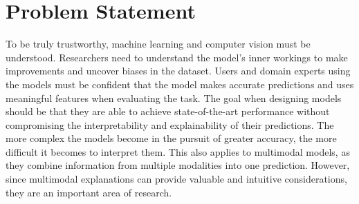\begin{comment}
In a short and precise way, state what your research is about in this thesis. It can be in the form of a (set of) research questions, goals/aims, or objectives (or a mix) - but it should clearly state what the problems or challenges you are addressing.

Alternatively, one can state a research hypothesis, but if so, it should follow the rules of what a hypothesis is. A hypothesis is a statement that introduces a research question and proposes an expected result. It is an integral part of the scientific method that forms the basis of scientific experiments. Therefore, you need to be careful and thorough when building your hypothesis, following the "rules".
\end{comment}

\section{Problem Statement}
    \label{sec:1_2_problem_statement}

To be truly trustworthy, machine learning and computer vision must be understood. Researchers need to understand the model's inner workings to make improvements and uncover biases in the dataset. Users and domain experts using the models must be confident that the model makes accurate predictions and uses meaningful features when evaluating the task. 
The goal when designing models should be that they are able to achieve state-of-the-art performance without compromising the interpretability and explainability of their predictions.
The more complex the models become in the pursuit of greater accuracy, the more difficult it becomes to interpret them. This also applies to multimodal models, as they combine information from multiple modalities into one prediction. However, since multimodal explanations can provide valuable and intuitive considerations, they are an important area of research.


\begin{comment}


The main topics that will be explored to reach the research goal are: 
\begin{itemize}
    \item Does an explainable image caption model improve its answers when trained on a \gls{vqa} dataset?
    \item With only the explaining model choosing the captions, will the output be more intuitive for humans?
    \item Are the explanations, both captions, and answers from open-ended questions locally faithful to the underlying \gls{cnn} model?
    \item If there is enough time during this thesis, it would be an interesting task to see if the image caption and \gls{vqa} will perform better when using transfer learning  on a language model pretrained on a large language dataset. 
\end{itemize}

\end{comment}

